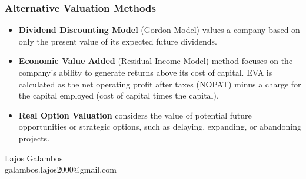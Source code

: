 \documentclass[serif, aspectratio=169]{beamer}
\begin{document}
\begin{frame}
	\frametitle<presentation>{Alternative Valuation Methods}

		\begin{itemize}
			\item \textbf{Dividend Discounting Model} (Gordon Model) values a company based on only the present value of its expected future dividends. 
            \item \textbf{Economic Value Added} (Residual Income Model)  method focuses on the company’s ability to generate returns above its cost of capital. EVA is calculated as the net operating profit after taxes (NOPAT) minus a charge for the capital employed (cost of capital times the capital).
            \item \textbf{Real Option Valuation} considers the value of potential future opportunities or strategic options, such as delaying, expanding, or abandoning projects.
    \end{itemize}

\end{frame}

\begin{frame}
\begin{center}

\vspace{1cm}

Lajos Galambos \\[1em]
galambos.lajos2000@gmail.com
\end{center}
\end{frame}
\end{document}
